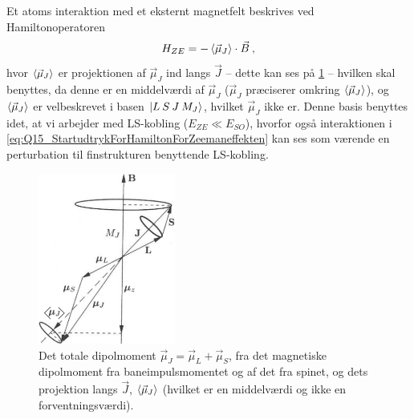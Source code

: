 Et atoms interaktion med et eksternt magnetfelt beskrives ved Hamiltonoperatoren
\begin{align} \label{eq:Q15_StartudtrykForHamiltonForZeemaneffekten}
    H_{ZE} = -\Braket{\Vec{\mu}_J} \cdot \Vec{B} \: ,
\end{align}
hvor $\Braket{\Vec{\mu}_J}$ er projektionen af $\Vec{\mu}_J$ ind langs $\Vec{J}$ -- dette kan ses på \cref{fig:Q15_ZeemanEffectInThePresenceOfSpin}
-- hvilken skal benyttes, da denne er en middelværdi af $\Vec{\mu}_J$ ($\Vec{\mu}_J$ præciserer omkring $\Braket{\Vec{\mu}_J}$), og $\Braket{\Vec{\mu}_J}$ er velbeskrevet i basen $\ket{L \: S \: J \: M_J}$, hvilket $\Vec{\mu}_J$ ikke er. Denne basis benyttes idet, at vi arbejder med LS-kobling ($E_{ZE} \ll E_{SO}$), hvorfor også interaktionen i \cref{eq:Q15_StartudtrykForHamiltonForZeemaneffekten} kan ses som værende en perturbation til finstrukturen benyttende LS-kobling.

\begin{figure}[!h]
    \centering
    \includegraphics[width=0.4\textwidth]{Q15/images/ZeemanEffectWithLSCoupling.PNG}
    \caption{Det totale dipolmoment $\Vec{\mu}_J = \Vec{\mu}_L + \Vec{\mu}_S$, fra det magnetiske dipolmoment fra baneimpulsmomentet og af det fra spinet, og dets projektion langs $\Vec{J}$, $\Braket{\Vec{\mu}_J}$ (hvilket er en middelværdi og ikke en forventningsværdi).}
    \label{fig:Q15_ZeemanEffectInThePresenceOfSpin}
\end{figure}

